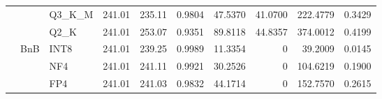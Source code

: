 \begin{table}[t]
{\begin{tabular}{ll l rrrrrrr}
 &  & Q3\_K\_M & 241.01 & 235.11 & 0.9804 & 47.5370 & 41.0700 & 222.4779 & 0.3429 \\
 &  & Q2\_K & 241.01 & 253.07 & \cellcolor{red!18} 0.9351 & \cellcolor{red!18} 89.8118 & 44.8357 & \cellcolor{red!18} 374.0012 & \cellcolor{red!18} 0.4199 \\
 & BnB & INT8 & 241.01 & 239.25 & 0.9989 & 11.3354 & \cellcolor{cyan!12} $0$ & 39.2009 & 0.0145 \\
 &  & NF4 & 241.01 & 241.11 & 0.9921 & 30.2526 & \cellcolor{cyan!12} $0$ & 104.6219 & 0.1900 \\
 &  & FP4 & 241.01 & 241.03 & 0.9832 & 44.1714 & \cellcolor{cyan!12} $0$ & 152.7570 & 0.2615 \\
\bottomrule
\end{tabular}}
\end{table}